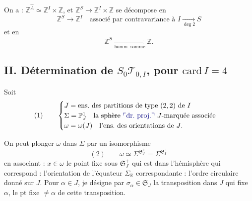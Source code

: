 \documentclass[11pt,a4paper]{article}
\begin{document}


On a : $\mathbb{Z}^{\hat A} \simeq \mathbb{Z}^I \times \mathbb{Z}$, et $\mathbb{Z}^S \to \mathbb{Z}^I \times \mathbb{Z}$ se décompose en
\[
  \mathbb{Z}^S \to \mathbb{Z}^I \quad \text{associé par contravariance à } I \xrightarrow[\deg 2]{} S
\]
et en
\[
  \mathbb{Z}^S \xrightarrow[\text{homm.\ somme}]{} \mathbb{Z} .
\]

\subsection{II. Détermination de $S_0\mathcal{T}_{0,I}$, pour $\mathrm{card}\, I = 4$}

Soit
\[
  (1) \qquad
  \begin{cases}
    J = \text{ens.\ des partitions de type $(2,2)$ de $I$} \\
    \Sigma = \mathbb{P}^1_J \quad \text{la \struck{sphère} \add{dr.\ proj.} $J$-marquée associée} \\
    \omega = \omega(J) \quad \text{l'ens.\ des orientations de $J$.}
  \end{cases}
\]

On peut plonger $\omega$ dans $\Sigma$ par un isomorphisme
\[
  (2) \qquad \omega \simeq \Sigma^{\mathfrak{S}_J^+} = \Sigma^{\mathfrak{S}_I^+}
\]
en associant : $x \in \omega$ le point fixe sous $\mathfrak{S}_J^+$ qui est dans l'hémisphère qui correspond : l'orientation de l'équateur $\Sigma_{\mathbb{R}}$ correspondante : l'ordre circulaire donné sur $J$. Pour \struck{\ill{}} $\alpha \in J$, je désigne par  $\sigma_\alpha \in \mathfrak{S}_J$ la transposition dans $J$ qui fixe $\alpha$, \struck{$\tilde\alpha$}\add{$\tilde\alpha$} le pt fixe \struck{\ill{}} $\neq \alpha$ de cette transposition.
\end{document}
